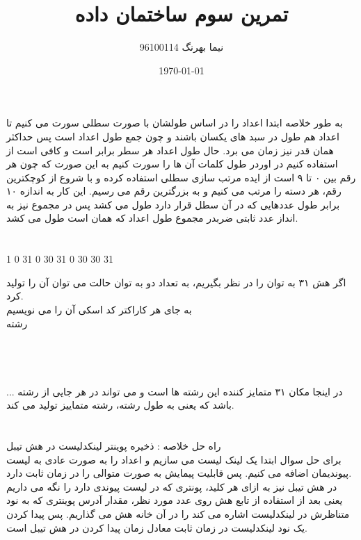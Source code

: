 \documentclass[a4paper]{article}
\title{تمرین سوم ساختمان داده}
\author{نیما بهرنگ 96100114}
\date{\today}
\begin{document}
\maketitle
{}

\section*{}
به طور خلاصه ابتدا اعداد را در اساس طولشان با صورت سطلی سورت می کنیم تا اعداد هم طول در سبد های یکسان باشند و چون جمع طول اعداد 
است پس حداکثر همان قدر نیز زمان می برد.
حال طول اعداد هر سطر برابر است و کافی است از 
استفاده کنیم در اوردر طول کلمات آن ها را سورت کنیم به این صورت که چون هر رقم بین ۰ تا ۹ است از ایده مرتب سازی سطلی استفاده کرده و با شروع از کوچکترین رقم، هر دسته را مرتب می کنیم و به بزرگترین رقم می رسیم.
این کار به اندازه ۱۰ برابر طول عددهایی که در آن سطل قرار دارد طول می کشد پس در مجموع نیز به انداز عدد ثابتی ضربدر مجموع طول اعداد که همان
است طول می کشد.

\newpage
\section*{}
1
0 31
0 30 31
0 30 30 31

اگر هش ۳۱ به توان 
را در نظر بگیریم، به تعداد دو به توان
حالت می توان آن را تولید کرد.\\
به جای هر کاراکتر کد اسکی آن را می نویسیم\\
رشته\\
\\
\\
\\
\\
...
در اینجا مکان ۳۱ متمایز کننده این رشته ها است و می تواند در هر جایی از رشته باشد که یعنی به طول رشته،  رشته متماییز تولید می کند.\\

\newpage

\section*{}
راه حل خلاصه : ذخیره پوینتر لینکدلیست در هش تیبل\\
برای حل سوال ابتدا یک لینک لیست می سازیم و اعداد را به صورت عادی به لیست پیوندیمان اضافه می کنیم. پس قابلیت پیمایش به صورت متوالی را در زمان ثابت دارد.\\
در هش تیبل نیز به ازای هر کلید، پونتری که در لیست پیوندی دارد را نگه می داریم یعنی بعد از استفاده از تابع هش روی عدد مورد نظر، مقدار آدرس پوینتری که به نود متناظرش در لینکدلیست اشاره می کند را در آن خانه هش می گذاریم. پس پیدا کردن یک نود لینکدلیست در زمان ثابت معادل زمان پیدا کردن در هش تیبل است.
\end{document}
